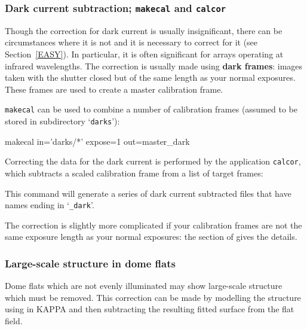\documentclass[twoside,11pt]{starlink}
\begin{document}
\subsubsection{Dark current subtraction; \texttt{makecal} and \texttt{calcor}}

Though the correction for dark current is usually insignificant, there
can be circumstances where it is not and it is necessary to correct for
it (see Section~\ref{EASY}).  In particular, it is often significant
for arrays operating at infrared wavelengths.  The correction is usually
made using \textbf{dark frames}: images taken with the shutter closed but of
the same length as your normal exposures.  These frames are used to create
a master calibration frame.

\texttt{makecal} can be used to combine a number of calibration frames
(assumed to be stored in subdirectory `\texttt{darks}'):

\begin{terminalv}
makecal in='darks/*' expose=1 out=master_dark
\end{terminalv}

Correcting the data for the dark current is performed by the application
\texttt{calcor}, which subtracts a scaled calibration frame from a list of
target frames:

\begin{terminalv}
\end{terminalv}

This command will generate a series of dark current subtracted files that
have names ending in `\texttt{\_dark}'.

The correction is slightly more complicated if your calibration frames
are not the same exposure length as your normal exposures: the
\/ section
of \/\cite{SUN139} gives the details.

\subsubsection{Large-scale structure in dome flats}

Dome flats which are not evenly illuminated may show large-scale structure
which must be removed.  This correction can be made by modelling the
structure using  in KAPPA
and then subtracting the resulting fitted surface from the flat field.
\end{document}
